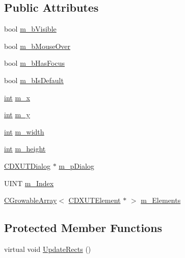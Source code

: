 \subsection*{Public Attributes}
\begin{DoxyCompactItemize}
\item 
bool \hyperlink{class_c_d_x_u_t_control_a9673eef8fa31de9e182f9a48d8b8cd16}{m\_\-bVisible}
\item 
bool \hyperlink{class_c_d_x_u_t_control_ab1f57181edbeedf121922db6cdc7d3ad}{m\_\-bMouseOver}
\item 
bool \hyperlink{class_c_d_x_u_t_control_a635408030201d3daf9fff7d5cb1c0076}{m\_\-bHasFocus}
\item 
bool \hyperlink{class_c_d_x_u_t_control_ad7553797639f844d3ad77f324d62043f}{m\_\-bIsDefault}
\item 
\hyperlink{_d_x_u_tgui_8cpp_a2d77ed03302b6978834ee3b6f57837fb}{int} \hyperlink{class_c_d_x_u_t_control_a7ff012a10429df693525a53638b5b71a}{m\_\-x}
\item 
\hyperlink{_d_x_u_tgui_8cpp_a2d77ed03302b6978834ee3b6f57837fb}{int} \hyperlink{class_c_d_x_u_t_control_a88a4c4b4337437eec5071bb36c789f07}{m\_\-y}
\item 
\hyperlink{_d_x_u_tgui_8cpp_a2d77ed03302b6978834ee3b6f57837fb}{int} \hyperlink{class_c_d_x_u_t_control_a273b313694fbe608f1e892402eb26357}{m\_\-width}
\item 
\hyperlink{_d_x_u_tgui_8cpp_a2d77ed03302b6978834ee3b6f57837fb}{int} \hyperlink{class_c_d_x_u_t_control_a6b29c74ead25395f0a2870c74b6bd336}{m\_\-height}
\item 
\hyperlink{class_c_d_x_u_t_dialog}{CDXUTDialog} $\ast$ \hyperlink{class_c_d_x_u_t_control_a2fdb56085c0e1b96cc27281e5480eb2e}{m\_\-pDialog}
\item 
UINT \hyperlink{class_c_d_x_u_t_control_a800474d07b3db99c726b586b5d4b945a}{m\_\-Index}
\item 
\hyperlink{class_c_growable_array}{CGrowableArray}$<$ \hyperlink{class_c_d_x_u_t_element}{CDXUTElement} $\ast$ $>$ \hyperlink{class_c_d_x_u_t_control_a8401888c4830d5cc2ff08ebf4289c255}{m\_\-Elements}
\end{DoxyCompactItemize}
\subsection*{Protected Member Functions}
\begin{DoxyCompactItemize}
\item 
virtual void \hyperlink{class_c_d_x_u_t_control_a5fb3a79178c678abaa0da57566a09002}{UpdateRects} ()
\end{DoxyCompactItemize}
